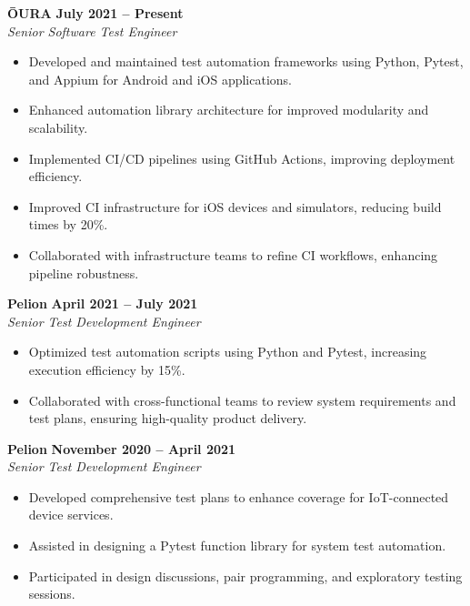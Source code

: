 \documentclass[12pt]{article}
\begin{document}
\textbf{ŌURA} \hfill \textbf{July 2021 – Present} \\
\textit{Senior Software Test Engineer} \\
\begin{itemize}
    \item Developed and maintained test automation frameworks using Python, Pytest, and Appium for Android and iOS applications.
    \item Enhanced automation library architecture for improved modularity and scalability.
    \item Implemented CI/CD pipelines using GitHub Actions, improving deployment efficiency.
    \item Improved CI infrastructure for iOS devices and simulators, reducing build times by 20\%.
    \item Collaborated with infrastructure teams to refine CI workflows, enhancing pipeline robustness.
\end{itemize}

\textbf{Pelion} \hfill \textbf{April 2021 – July 2021} \\
\textit{Senior Test Development Engineer} \\
\begin{itemize}
    \item Optimized test automation scripts using Python and Pytest, increasing execution efficiency by 15\%.
    \item Collaborated with cross-functional teams to review system requirements and test plans, ensuring high-quality product delivery.
\end{itemize}

\textbf{Pelion} \hfill \textbf{November 2020 – April 2021} \\
\textit{Senior Test Development Engineer} \\
\begin{itemize}
    \item Developed comprehensive test plans to enhance coverage for IoT-connected device services.
    \item Assisted in designing a Pytest function library for system test automation.
    \item Participated in design discussions, pair programming, and exploratory testing sessions.
\end{itemize}
\end{document}

